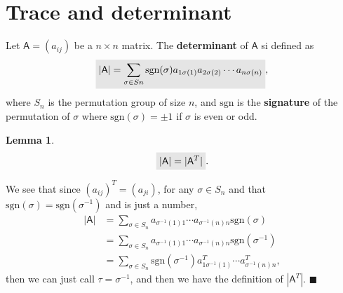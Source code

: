 \documentclass[letter-paper]{tufte-book}
\newtheorem{lemma}[theorem]{\color{pastel-blue}Lemma}
\newenvironment{proof}[1][Proof]{\begin{trivlist}
\item[\hskip \labelsep {\bfseries #1}]}{\end{trivlist}}
\newcommand{\As}{{\mathsf{A}}}
\newcommand{\qed}{\hfill$\blacksquare$}
\newcommand{\highlight}[1]{\mathchoice%
  {\colorbox{black!10}{$\displaystyle#1$}}%
  {\colorbox{black!10}{$\textstyle#1$}}%
  {\colorbox{black!10}{$\scriptstyle#1$}}%
  {\colorbox{black!10}{$\scriptscriptstyle#1$}}}%
\begin{document}

\section{Trace and determinant}

Let $\As = (a_{ij})$ be a $n \times n$ matrix. The \textbf{determinant} of $\As$ si defined as
\begin{equation}
  \highlight{|\As| = \sum_{\sigma\in Sn} \mbox{sgn}(\sigma) a_{1\sigma(1)} a_{2\sigma(2)}\cdots a_{n\sigma(n)}},
\end{equation}
where $S_n$ is the permutation group of size $n$, and $\mbox{sgn}$ is the \textbf{signature} of the permutation of $\sigma$ where $\mbox{sgn}(\sigma)=\pm 1$ if $\sigma$ is even or odd.

\begin{lemma}
  \begin{equation}
    \highlight{|\As| = |\As^T|}.
  \end{equation}
\end{lemma}

\begin{proof}
  We see that since $(a_{ij})^T = (a_{ji})$, for any $\sigma \in S_n$ and that $\mbox{sgn}(\sigma) = \mbox{sgn}(\sigma^{-1})$ and is just a number,
  \begin{align*}
    |\As| &= \sum_{\sigma\in S_n} a_{\sigma^{-1}(1)1}\cdots a_{\sigma^{-1}(n)n} \mbox{sgn}(\sigma) \\
    &= \sum_{\sigma\in S_n} a_{\sigma^{-1}(1)1}\cdots a_{\sigma^{-1}(n)n} \mbox{sgn}(\sigma^{-1}) \\
    &= \sum_{\sigma\in S_n} \mbox{sgn}(\sigma^{-1}) a^T_{1\sigma^{-1}(1)}\cdots a^T_{\sigma^{-1}(n)n},
  \end{align*}
  then we can just call $\tau = \sigma^{-1}$, and then we have the definition of $|\As^T|$. \qed
\end{proof}
\end{document}
